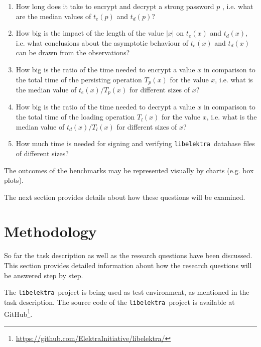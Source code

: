 \documentclass[a4paper,12pt]{article}
\newcommand{\libelektra}{\texttt{libelektra}~}
\begin{document}
\begin{enumerate}
\item How long does it take to encrypt and decrypt a strong password $p$ \cite{5461951,Holt:2011:IRS:2047456.2047461}, i.e. what are the median values of $t_e(p)$ and $t_d(p)$?

\item How big is the impact of the length of the value $|x|$ on $t_e(x)$ and $t_d(x)$, i.e. what conclusions about the asymptotic behaviour of $t_e(x)$ and $t_d(x)$ can be drawn from the observations?

\item How big is the ratio of the time needed to encrypt a value $x$ in comparison to the total time of the persisting operation $T_p(x)$ for the value $x$, i.e. what is the median value of $t_e(x)/T_p(x)$ for different sizes of $x$?

\item How big is the ratio of the time needed to decrypt a value $x$ in comparison to the total time of the loading operation $T_l(x)$ for the value $x$, i.e. what is the median value of $t_d(x)/T_l(x)$ for different sizes of $x$?

\item How much time is needed for signing and verifying \libelektra database files of different sizes?

\end{enumerate}

The outcomes of the benchmarks may be represented visually by charts (e.g. box plots).

The next section provides details about how these questions will be examined.


\section{Methodology}

So far the task description as well as the research questions have been discussed.
This section provides detailed information about how the research questions will be answered step by step.

The \libelektra project is being used as test environment, as mentioned in the task description.
The source code of the \libelektra project is available at GitHub\footnote{\url{https://github.com/ElektraInitiative/libelektra/}}.
\end{document}
